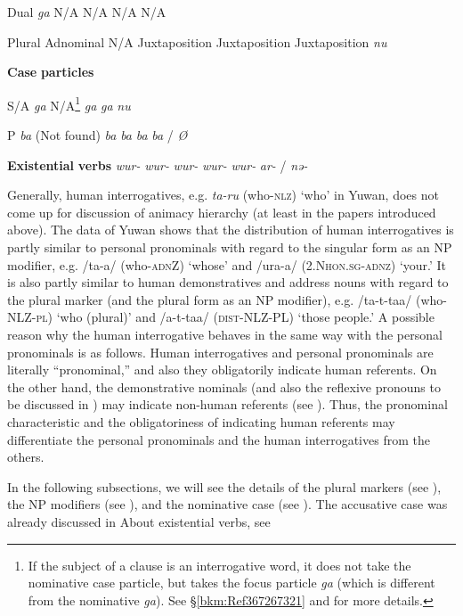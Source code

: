 Dual     \textit{ga}  N/A  N/A  N/A  N/A

Plural  Adnominal  N/A  Juxtaposition  Juxtaposition  Juxtaposition  \textit{nu}

\textbf{Case} \textbf{particles}          

S/A     \textit{ga}  N/A\footnote{If the subject of a clause is an interrogative word, it does not take the nominative case particle, but takes the focus particle \textit{ga} (which is different from the nominative \textit{ga}). See §\ref{bkm:Ref367267321} and  for more details.}  \textit{ga}  \textit{ga}  \textit{nu}

P     \textit{ba}  (Not found)  \textit{ba}  \textit{ba}  \textit{ba}  \textit{ba} / \textit{Ø}

\textbf{Existential} \textbf{verbs}      \textit{wur-}  \textit{wur-}  \textit{wur-}  \textit{wur-}  \textit{wur-}  \textit{ar-} / \textit{nə-}

Generally, human interrogatives, e.g. \textit{ta-ru} (who-\textsc{nlz}) ‘who’ in Yuwan, does not come up for discussion of animacy hierarchy (at least in the papers introduced above). The data of Yuwan shows that the distribution of human interrogatives is partly similar to personal pronominals with regard to the singular form as an NP modifier, e.g. /ta-a/ (who-\textsc{adn}Z) ‘whose’ and /ura-a/ (2.N\textsc{hon}.\textsc{sg}-\textsc{adnz}) ‘your.’ It is also partly similar to human demonstratives and address nouns with regard to the plural marker (and the plural form as an NP modifier), e.g. /ta-t-taa/ (who-NLZ-\textsc{pl}) ‘who (plural)’ and /a-t-taa/ (\textsc{dist}-NLZ-PL) ‘those people.’ A possible reason why the human interrogative behaves in the same way with the personal pronominals is as follows. Human interrogatives and personal pronominals are literally “pronominal,” and also they obligatorily indicate human referents. On the other hand, the demonstrative nominals (and also the reflexive pronouns to be discussed in ) may indicate non-human referents (see ). Thus, the pronominal characteristic and the obligatoriness of indicating human referents may differentiate the personal pronominals and the human interrogatives from the others.

In the following subsections, we will see the details of the plural markers (see ), the NP modifiers (see ), and the nominative case (see ). The accusative case was already discussed in  About existential verbs, see 


